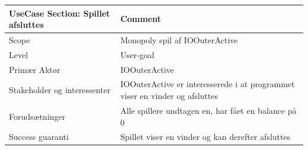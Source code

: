 \begin{center}
\begin{tabular}{ | m{10em} | m{10cm}| }
        \hline
            UseCase Section: Spillet afsluttes & Comment\\
        \hline
            Scope & Monopoly spil af IOOuterActive\\
        \hline
            Level & User-goal\\
        \hline
            Primær Aktør & IOOuterActive\\
        \hline
            Stakeholder og interessenter & IOOuterActive er interesserede i at programmet viser en vinder og afsluttes\\
        \hline
            Forudsætninger & Alle spillere undtagen en, har fået en balance på 0\\
        \hline
            Success guaranti &Spillet viser en vinder og kan derefter afsluttes\\
        \hline
    \end{tabular}
\end{center}
